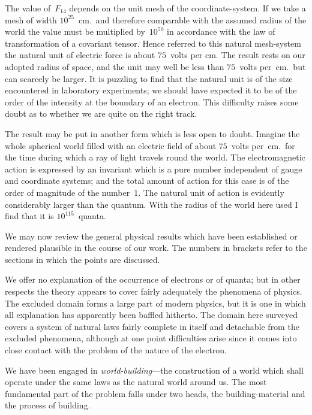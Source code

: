 \documentclass[12pt]{book}
\begin{document}
The value of~$F_{14}$ depends on the unit mesh of the coordinate\hyp{}system. If
we take a mesh of width $10^{25}$~cm.\ and therefore comparable with the assumed
radius of the world the value must be multiplied by~$10^{50}$ in accordance with
the law of transformation of a covariant tensor. Hence referred to this natural
mesh\hyp{}system the natural unit of electric force is about $75$~volts per cm. The
result rests on our adopted radius of space, and the unit may well be less than
$75$~volts per~cm.\ but can scarcely be larger. It is puzzling to find that the
natural unit is of the size encountered in laboratory experiments; we should
%
have expected it to be of the order of the intensity at the boundary of an
electron. This difficulty raises some doubt as to whether we are quite on the
right track.

The result may be put in another form which is less open to doubt.
Imagine the whole spherical world filled with an electric field of about $75$~volts
per~cm.\ for the time during which a ray of light travels round the world. The
electromagnetic action is expressed by an invariant which is a pure number
%
independent of gauge and coordinate systems; and the total amount of action
for this case is of the order of magnitude of the number~$1$. The natural unit
of action is evidently considerably larger than the quantum. With the radius
%
%
of the world here used I find that it is $10^{115}$~quanta.


We may now review the general physical results which have been established
or rendered plausible in the course of our work. The numbers in brackets
refer to the sections in which the points are discussed.

We offer no explanation of the occurrence of electrons or of quanta; but
in other respects the theory appears to cover fairly adequately the phenomena
of physics. The excluded domain forms a large part of modern physics, but it
is one in which all explanation has apparently been baffled hitherto. The
domain here surveyed covers a system of natural laws fairly complete in itself
and detachable from the excluded phenomena, although at one point difficulties
arise since it comes into close contact with the problem of the nature of the
electron.

We have been engaged in \emph{world\hyp{}building}---the construction of a world
which shall operate under the same laws as the natural world around us. The
most fundamental part of the problem falls under two heads, the building\hyp{}material
and the process of building.
\end{document}
